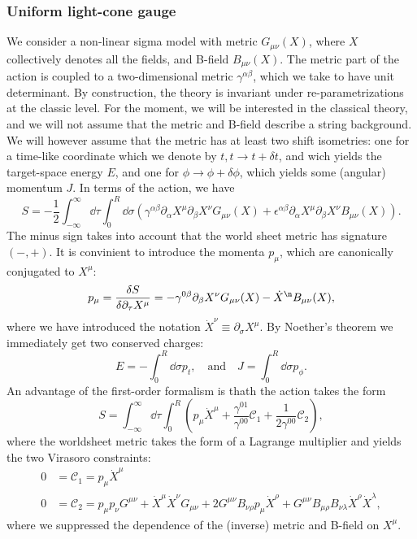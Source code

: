 \subsubsection{Uniform light-cone gauge}
We consider a non-linear sigma model with metric $G_{\mu\nu}(X)$, where $X$
collectively denotes all the fields, and B-field $B_{\mu\nu}(X)$. The metric
part of the action is coupled to a two-dimensional metric
$\gamma^{\alpha\beta}$, which we take to have unit determinant. By
construction, the theory is invariant under re-parametrizations at the classic
level. For the moment, we will be interested in the classical theory, and we
will not assume that the metric and B-field describe a string background. We
will however assume that the metric has at least two shift isometries: one for
a time-like coordinate which we denote by $t, t\rightarrow t+\delta t$, and
wich yields the  target-space energy $E$, and one for $\phi\rightarrow \phi
+ \delta\phi$, which yields some (angular) momentum $J$. In terms of the
action, we have
\begin{equation}
  S = -\frac{1}{2}\int_{-\infty}^{\infty}\dd\tau\int_{0}^{R}\dd\sigma\left(\gamma^{\alpha\beta}\partial_\alpha
    X^\mu\partial_\beta X^\nu G_{\mu\nu}(X) + \epsilon^{\alpha\beta}\partial_\alpha
  X^\mu\partial_\beta X^\nu B_{\mu\nu}(X)\right).
\end{equation}
The minus sign takes into account that the world sheet metric has signature
$(-,+)$. It is convinient to introduce the momenta $p_\mu$, which are
canonically conjugated to $X^\mu$:
\begin{equation}
  p_\mu = \frac{\delta S}{\delta \partial_\tau X^\mu}
  = -\gamma^{0\beta}\partial_\beta X^\nu G_{\mu\nu}(X) - \dot{X}^\n
  B_{\mu\nu}(X),
\end{equation}
where we have introduced the notation $\dot{X}^\nu \equiv \partial_\sigma
X^\mu$. By Noether's theorem we immediately get two conserved charges:
\begin{equation}
  E = - \int_{0}^{R}\dd\sigma p_t, \quad \mathrm{and}\quad
  J = \int_{0}^{R}\dd\sigma p_\phi .
\end{equation}
An advantage of the first-order formalism is thath the action takes the form
\begin{equation}
  S = \int_{-\infty}^{\infty}\dd\tau\int_{0}^{R}\left(p_\mu\dot{X}^\mu
    + \frac{\gamma^{01}}{\gamma^{00}}\mathcal{C}_1
  + \frac{1}{2\gamma^{00}}\mathcal{C}_2\right),
\end{equation}
where the worldsheet metric takes the  form of a Lagrange multiplier and yields
the two Virasoro constraints:
\begin{align}
  0 &= \mathcal{C}_1 = p_\mu \dot{X}^\mu\nonumber\\
  0 &= \mathcal{C}_2 = p_\mu p_\nu G^{\mu\nu} + \dot{X}^\mu\dot{X}^\nu
  G_{\mu\nu} + 2 G^{\mu\nu} B_{\nu\rho} p_\mu \dot{X}^\rho
  + G^{\mu\nu}B_{\mu\rho}B_{\nu\lambda}\dot{X}^\rho\dot{X}^\lambda,
\end{align}
where we  suppressed the dependence of the (inverse) metric and B-field on
$X^{\mu}$.




